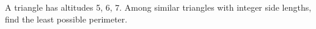 A triangle has altitudes 5, 6, 7. Among similar triangles with integer side lengths, find the least possible perimeter.
